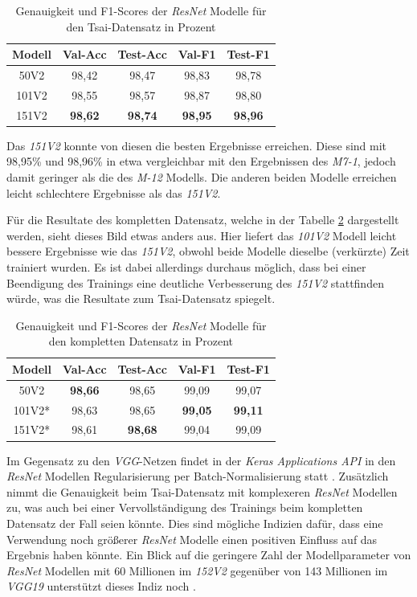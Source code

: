 \documentclass[twoside,a4paper]{IEEEtran}
\begin{document}
\begin{table}[!htb]
	\caption{Genauigkeit und F1-Scores der \emph{ResNet} Modelle für den Tsai-Datensatz in Prozent}
	\label{resnet_ergebnis_tsai}
	\centering
	\begin{tabular}{|c|c|c|c|c|}
		\hline
		Modell & Val-Acc & Test-Acc & Val-F1 & Test-F1\\
		\hline
		\hline
	 	50V2 & 98,42 & 98,47 & 98,83 & 98,78\\
		\hline
		101V2 & 98,55 & 98,57 & 98,87 & 98,80\\
		\hline
		151V2 & \textbf{98,62} & \textbf{98,74} & \textbf{98,95} & \textbf{98,96}\\
		\hline 
	\end{tabular}
\end{table} 

Das \emph{151V2} konnte von diesen die besten Ergebnisse erreichen. Diese sind mit 98,95\% und 98,96\% in etwa vergleichbar mit den Ergebnissen des \emph{M7-1}, jedoch damit geringer als die des \emph{M-12} Modells. Die anderen beiden Modelle erreichen leicht schlechtere Ergebnisse als das \emph{151V2}. 

Für die Resultate des kompletten Datensatz, welche in der Tabelle \ref{resnet_ergebnis_full} dargestellt werden, sieht dieses Bild etwas anders aus. Hier liefert das \emph{101V2} Modell leicht bessere Ergebnisse wie das \emph{151V2}, obwohl beide Modelle dieselbe (verkürzte) Zeit trainiert wurden. Es ist dabei allerdings durchaus möglich, dass bei einer Beendigung des Trainings eine deutliche Verbesserung des \emph{151V2} stattfinden würde, was die Resultate zum Tsai-Datensatz spiegelt.
\begin{table}[!htb]
	\caption{Genauigkeit und F1-Scores der \emph{ResNet} Modelle für den kompletten Datensatz in Prozent}
	\label{resnet_ergebnis_full}
	\centering
	\begin{tabular}{|c|c|c|c|c|}
		\hline
		Modell & Val-Acc & Test-Acc & Val-F1 & Test-F1\\
		\hline
		\hline 
		50V2 & \textbf{98,66} & 98,65 & 99,09 & 99,07\\
		\hline
		101V2* & 98,63 & 98,65 & \textbf{99,05} & \textbf{99,11}\\
		\hline
		151V2* & 98,61 & \textbf{98,68} & 99,04 & 99,09\\
		\hline 
	\end{tabular}
\end{table}

Im Gegensatz zu den \emph{VGG}-Netzen findet in der \emph{Keras Applications API} in den \emph{ResNet} Modellen Regularisierung per Batch-Normalisierung statt \cite{resnet_keras}. Zusätzlich nimmt die Genauigkeit beim Tsai-Datensatz mit komplexeren \emph{ResNet} Modellen zu, was auch bei einer Vervollständigung des Trainings beim kompletten Datensatz der Fall seien könnte. Dies sind mögliche Indizien dafür, dass eine Verwendung noch größerer \emph{ResNet} Modelle einen positiven Einfluss auf das Ergebnis haben könnte. Ein Blick auf die geringere Zahl der Modellparameter von \emph{ResNet} Modellen mit 60 Millionen im \emph{152V2} gegenüber von 143 Millionen im \emph{VGG19} unterstützt dieses Indiz noch \cite{keras_app}.
\end{document}
